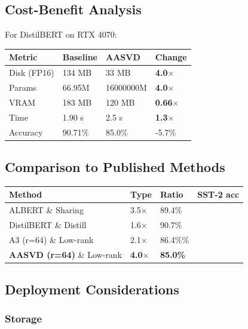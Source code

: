 \subsection{Cost-Benefit Analysis}

For DistilBERT on RTX 4070:

\begin{table}[H]
\centering
\small
\begin{tabular}{llll}
\toprule
\textbf{Metric} & \textbf{Baseline} & \textbf{AASVD} & \textbf{Change} \\
\midrule
Disk (FP16) & 134 MB & 33 MB & \textbf{4.0$\times$} \\
Params & 66.95M & 16000000M & \textbf{4.0$\times$} \\
VRAM & 183 MB & 120 MB & \textbf{0.66$\times$} \\
Time & 1.90 s & 2.5 s & \textbf{1.3$\times$} \\
Accuracy & 90.71\% & 85.0\% & -5.7\% \\
\bottomrule
\end{tabular}
\end{table}

\subsection{Comparison to Published Methods}

\begin{table}[H]
\centering
\small
\begin{tabular}{llll}
\toprule
\textbf{Method} & \textbf{Type} & \textbf{Ratio} & \textbf{SST-2 acc} \\
\midrule
ALBERT \& Sharing & 3.5$\times$ & 89.4\% \\
DistilBERT \& Distill & 1.6$\times$ & 90.7\% \\
A3 (r=64) \& Low-rank & 2.1$\times$ & 86.4\%\% \\
\textbf{AASVD (r=64)} \& Low-rank & \textbf{4.0$\times$} & \textbf{85.0\%} \\
\bottomrule
\end{tabular}
\end{table}

\subsection{Deployment Considerations}

\subsubsection{Storage}

